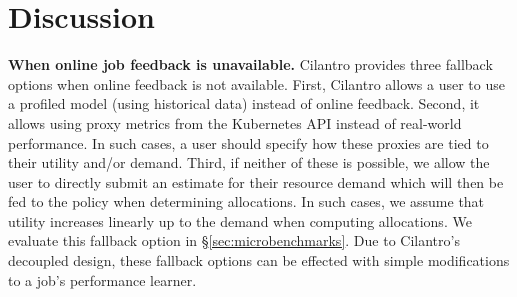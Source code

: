 


\section{Discussion}
\label{sec:cilantro_discussion}


\textbf{When online job feedback is unavailable.}
Cilantro provides three fallback options when online feedback is not available.
First, Cilantro allows a user to use a profiled model (using historical data) instead of
online feedback.
Second, it allows using proxy metrics from the Kubernetes API instead of real-world performance.
In such cases, a user should specify how these proxies are tied to their utility
and/or demand.
Third, if neither of these is possible, we allow the user to directly submit an estimate for their resource
demand  which will then be fed to the policy when determining allocations.
In such cases, we assume that utility increases linearly up to the demand when computing
allocations.
We evaluate this fallback option in \S\ref{sec:microbenchmarks}.
Due to Cilantro's decoupled design, these fallback options can be effected with simple modifications
to a job's performance learner.


